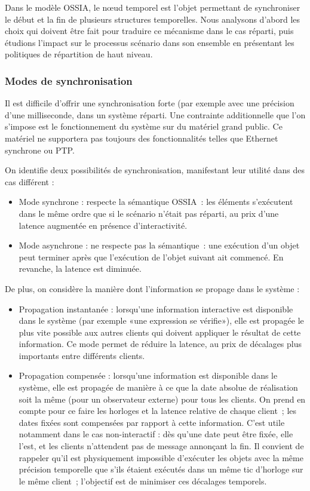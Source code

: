 \documentclass[10pt]{article}
\newcommand\ossia{OSSIA\xspace}
\begin{document}
Dans le modèle \ossia, le nœud temporel est l'objet permettant de synchroniser le début et la fin de plusieurs structures temporelles. 
Nous analysons d'abord les choix qui doivent être fait pour traduire ce mécanisme dans le cas réparti, puis étudions l'impact sur le processus scénario dans son ensemble en présentant les politiques de répartition de haut niveau.
\subsubsection{Modes de synchronisation}
Il est difficile d'offrir une synchronisation forte (par exemple avec une précision d'une milliseconde, dans un système réparti\cite{sheehy2015there}. 
Une contrainte additionnelle que l'on s'impose est le fonctionnement du système sur du matériel grand public. 
Ce matériel ne supportera pas toujours des fonctionnalités telles que Ethernet synchrone\cite{ferrant2008synchronous} ou PTP.


On identifie deux possibilités de synchronisation, manifestant leur utilité dans des cas différent : 
\begin{itemize}
	\item Mode synchrone : respecte la sémantique \ossia{}~: les éléments s'exécutent dans le même ordre que si le scénario n'était pas réparti, au prix d'une latence augmentée en présence d'interactivité.
	\item Mode asynchrone : ne respecte pas la sémantique~: une exécution d'un objet peut terminer après que l'exécution de l'objet suivant ait commencé. En revanche, la latence est diminuée.    
\end{itemize}

De plus, on considère la manière dont l'information se propage dans le système :

\begin{itemize}
	\item Propagation instantanée : lorsqu'une information interactive est disponible dans le système (par exemple «une expression se vérifie»), elle est propagée le plus vite possible aux autres clients qui doivent appliquer le résultat de cette information. 
    Ce mode permet de réduire la latence, au prix de décalages plus importants entre différents clients.
	\item Propagation compensée : lorsqu'une information est disponible dans le système, elle est propagée de manière à ce que la date absolue de réalisation soit la même (pour un observateur externe) pour tous les clients. 
	On prend en compte pour ce faire les horloges et la latence relative de chaque client~; les dates fixées sont compensées par rapport à cette information.
	C'est utile notamment dans le cas non-interactif : dès qu'une date peut être fixée, elle l'est, et les clients n'attendent pas de message annonçant la fin. 
	Il convient de rappeler qu'il est physiquement impossible d'exécuter les objets avec la même précision temporelle que s'ils étaient exécutés dans un même tic d'horloge sur le même client~; l'objectif est de minimiser ces décalages temporels.
\end{itemize}
\end{document}
